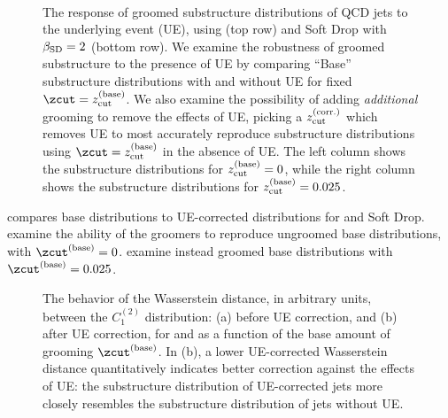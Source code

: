\documentclass[letterpaper,11pt]{article}
\begin{document}
\begin{figure}[p]
\centering
    \\
\caption{
The response of groomed substructure distributions of QCD jets to the underlying event (UE), using  (top row) and Soft Drop with \(\beta_{\rm SD} = 2\) (bottom row).
%
We examine the robustness of groomed substructure to the presence of UE by comparing ``Base'' substructure distributions with and without UE for fixed \(\zcut = z^{(\rm base)}_{\rm cut}\).
%
We also examine the possibility of adding \textit{additional} grooming to remove the effects of UE, picking a \(z^{(\rm corr.)}_{\rm cut}\) which removes UE to most accurately reproduce substructure distributions using \(\zcut = z^{(\rm base)}_{\rm cut}\) in the absence of UE.
%
The left column shows the substructure distributions for \(z^{(\rm base)}_{\rm cut} = 0\), while the right column shows the substructure distributions for \(z^{(\rm base)}_{\rm cut} = 0.025\).
}
\label{fig:ue}
\end{figure}


 compares base distributions to UE-corrected distributions for  and Soft Drop.
%
 examine the ability of the groomers to reproduce ungroomed base distributions, with \(\zcut^{(\rm base)} = 0\).
%
 examine instead groomed base distributions with \(\zcut^{(\rm base)} = 0.025\).

\begin{figure}[]
\centerline{
}
\caption{
    The behavior of the Wasserstein distance, in arbitrary units, between the \(C_1^{(2)}\) distribution: (a) before UE correction, and (b) after UE correction, for  and  as a function of the base amount of grooming \(\zcut^{(\rm base)}\).
    In (b), a lower UE-corrected Wasserstein distance quantitatively indicates better correction against the effects of UE:
    the substructure distribution of UE-corrected jets more closely resembles the substructure distribution of jets without UE.
}
\label{fig:ue_2}
\centering
\end{figure}
\end{document}
